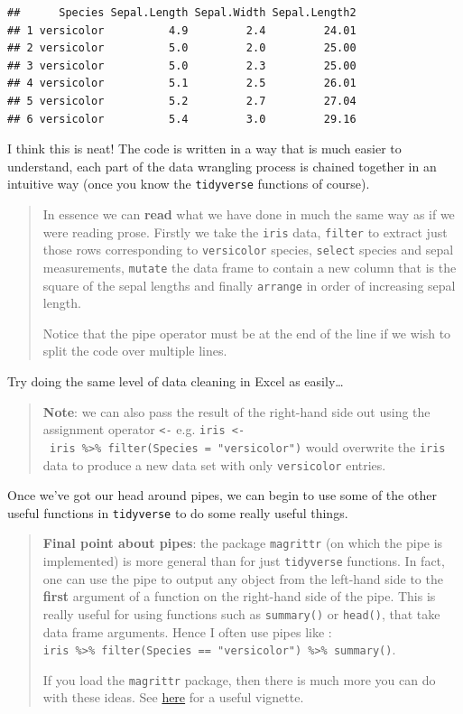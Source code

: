 \documentclass[]{book}
\theoremstyle{definition}
\theoremstyle{definition}
\theoremstyle{definition}
\theoremstyle{remark}
\begin{document}
\begin{verbatim}
##      Species Sepal.Length Sepal.Width Sepal.Length2
## 1 versicolor          4.9         2.4         24.01
## 2 versicolor          5.0         2.0         25.00
## 3 versicolor          5.0         2.3         25.00
## 4 versicolor          5.1         2.5         26.01
## 5 versicolor          5.2         2.7         27.04
## 6 versicolor          5.4         3.0         29.16
\end{verbatim}

I think this is neat! The code is written in a way that is much easier
to understand, each part of the data wrangling process is chained
together in an intuitive way (once you know the \texttt{tidyverse}
functions of course).

\begin{quote}
In essence we can \textbf{read} what we have done in much the same way
as if we were reading prose. Firstly we take the \texttt{iris} data,
\texttt{filter} to extract just those rows corresponding to
\texttt{versicolor} species, \texttt{select} species and sepal
measurements, \texttt{mutate} the data frame to contain a new column
that is the square of the sepal lengths and finally \texttt{arrange} in
order of increasing sepal length.

Notice that the pipe operator must be at the end of the line if we wish
to split the code over multiple lines.
\end{quote}

Try doing the same level of data cleaning in Excel as easily\ldots{}

\begin{quote}
\textbf{Note}: we can also pass the result of the right-hand side out
using the assignment operator \texttt{\textless{}-} e.g.
\texttt{iris\ \textless{}-\ iris\ \%\textgreater{}\%\ filter(Species\ =\ "versicolor")}
would overwrite the \texttt{iris} data to produce a new data set with
only \texttt{versicolor} entries.
\end{quote}

Once we've got our head around pipes, we can begin to use some of the
other useful functions in \texttt{tidyverse} to do some really useful
things.

\begin{quote}
\textbf{Final point about pipes}: the package \texttt{magrittr} (on
which the pipe is implemented) is more general than for just
\texttt{tidyverse} functions. In fact, one can use the pipe to output
any object from the left-hand side to the \textbf{first} argument of a
function on the right-hand side of the pipe. This is really useful for
using functions such as \texttt{summary()} or \texttt{head()}, that take
data frame arguments. Hence I often use pipes like :
\texttt{iris\ \%\textgreater{}\%\ filter(Species\ ==\ "versicolor")\ \%\textgreater{}\%\ summary()}.

If you load the \texttt{magrittr} package, then there is much more you
can do with these ideas. See
\href{https://cran.r-project.org/web/packages/magrittr/vignettes/magrittr.html}{here}
for a useful vignette.
\end{quote}
\end{document}
